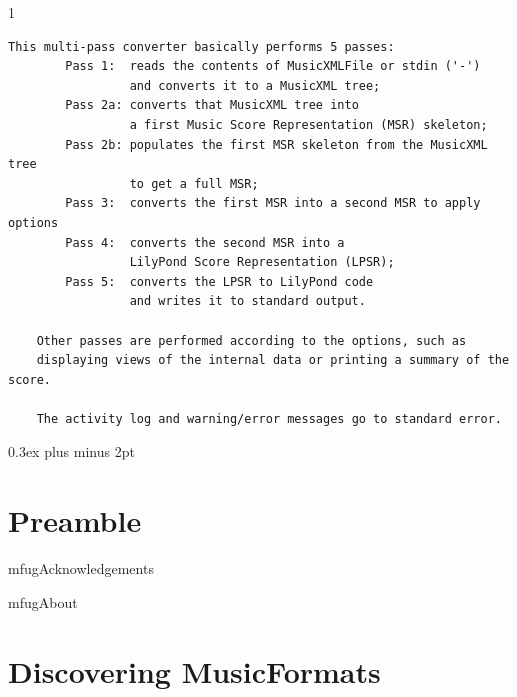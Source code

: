 \documentclass[11pt,a4paper]{report}
\begin{document}
\begin{titlepage}
\begin{center}
\begin{turn}{1}
{\begin{minipage}{\linewidth}
\begin{lstlisting}[language=Terminal]
    This multi-pass converter basically performs 5 passes:
        Pass 1:  reads the contents of MusicXMLFile or stdin ('-')
                 and converts it to a MusicXML tree;
        Pass 2a: converts that MusicXML tree into
                 a first Music Score Representation (MSR) skeleton;
        Pass 2b: populates the first MSR skeleton from the MusicXML tree
                 to get a full MSR;
        Pass 3:  converts the first MSR into a second MSR to apply options
        Pass 4:  converts the second MSR into a
                 LilyPond Score Representation (LPSR);
        Pass 5:  converts the LPSR to LilyPond code
                 and writes it to standard output.

    Other passes are performed according to the options, such as
    displaying views of the internal data or printing a summary of the score.

    The activity log and warning/error messages go to standard error.
\end{lstlisting} %
\end{minipage}
}
\end{turn}
\end{center}
\end{titlepage}

{ %
  \setlength {\parskip} {0.3ex plus \baselineskip minus 2pt}

  \listoffigures

  \tableofcontents
}


\part{Preamble}


\useRegularPagesHeadersAndFooters


{mfugAcknowledgements}

{mfugAbout}


\part{Discovering MusicFormats}
\end{document}

